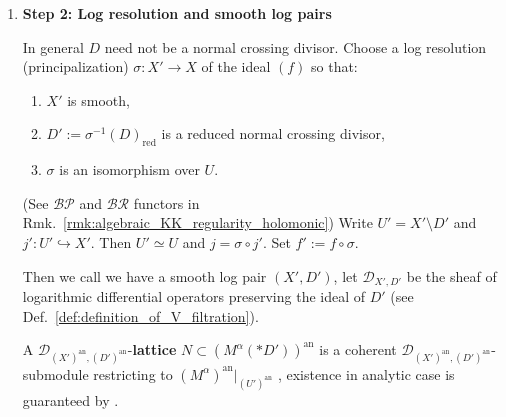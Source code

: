 \begin{remark}
\begin{enumerate}
              On $U$ the multi-valued function $f^\alpha$ defines a rank-one integrable connection
              $\mathcal O_U\cdot f^\alpha$ (recall we defined it in the proof of (4) in Prop.~\ref{prop:properties_of_alpha_nearby_cycles} and see Prop.~\ref{prop:integrable-connection-characterizations}) and hence a rank-one local system $f^{-1}L_1^\lambda$.

              $\mathcal O_U\cdot f^\alpha := f^\ast \big(\C[t,t^{-1}]t^{\alpha}\big)$ is regular holonomic on $U$ \cite[Theorem~6.1.5]{hotta2008d},
              provided we prove that $\C[t,t^{-1}]t^{\alpha}$ is regular holonomic on $\mathbb{A}^1_\C \setminus \{0\}$.
              To prove this one should embed it into $\mathbb{P}^1_\C$.

              Define the meromorphic $\mathcal D_X$-module
              \[
                  M^\alpha := \mathcal O_X(*D)\cdot f^\alpha,
              \]
              which is also an integrable connection when restricted to $U$.
        \item \textbf{Step 2: Log resolution and smooth log pairs}

              In general $D$ need not be a normal crossing divisor.
              Choose a log resolution (principalization) $\sigma:X'\to X$ of the ideal $(f)$ so that:
              \begin{enumerate}
                  \item $X'$ is smooth,
                  \item $D':=\sigma^{-1}(D)_{\mathrm{red}}$ is a reduced normal crossing divisor,
                  \item $\sigma$ is an isomorphism over $U$.
              \end{enumerate}
              (See $\mathcal{BP}$ and $\mathcal{BR}$ functors in Rmk.~\ref{rmk:algebraic_KK_regularity_holomonic})
              Write $U'=X'\setminus D'$ and $j':U'\hookrightarrow X'$.
              Then $U'\simeq U$ and $j=\sigma\circ j'$.
              Set $f':=f\circ \sigma$.

              Then we call we have a smooth log pair $(X',D')$, let $\mathcal D_{X',D'}$ be the sheaf of logarithmic
              differential operators preserving the ideal of $D'$ (see Def.~\ref{def:definition_of_V_filtration}).

              A $\mathcal D_{(X')^\mathrm{an},(D')^\mathrm{an}}$-\textbf{lattice} $N \subset (M^\alpha(*D'))^\mathrm{an}$ is a coherent
              $\mathcal D_{(X')^\mathrm{an},(D')^\mathrm{an}}$-submodule restricting to $(M^\alpha)^\mathrm{an}|_{(U')^\mathrm{an}}$ \cite[\S3.3]{Wu2021CharacteristicCyclesHolonomicDmodules}\cite[Def.~2.4]{WuZhou2019LogDmodules},
              existence in analytic case is guaranteed by \cite[Theorem~5.2.17]{hotta2008d}.


\end{enumerate}
\end{remark}

